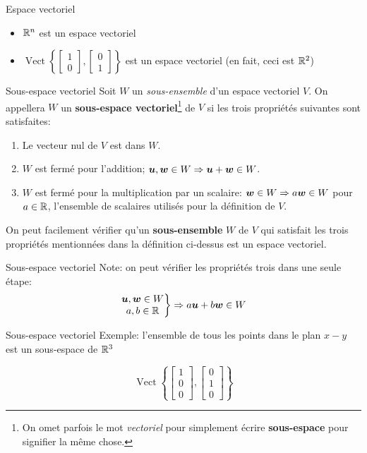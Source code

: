 \documentclass[french, handout]{beamer}
\begin{document}
\begin{frame}{Espace vectoriel}
\begin{itemize}
\item $\mathbb{R}^n$ est un espace vectoriel
\item $\displaystyle
\operatorname{Vect}\left\{
\begin{bmatrix}
1 \\ 0
\end{bmatrix}
,\begin{bmatrix}
0 \\ 1
\end{bmatrix}
\right\}
$
est un espace vectoriel (en fait, ceci est $\mathbb{R}^2$)
\end{itemize}
\end{frame}

\begin{frame}{Sous-espace vectoriel}
Soit $W$ un \textit{sous-ensemble} d'un espace vectoriel $V$.  
On appellera $W$ un \textbf{sous-espace vectoriel}\footnote{On omet parfois le mot \textit{vectoriel}
pour simplement écrire \textbf{sous-espace} pour signifier la même chose.} de $V$ si
les trois propriétés suivantes sont satisfaites:
\begin{enumerate}
\item Le vecteur nul de $V$ est dans $W$.
\item $W$ est fermé pour l'addition; $\boldsymbol{u}, \boldsymbol{w} \in W \Rightarrow \boldsymbol{u} + \boldsymbol{w} \in W$.
\item $W$ est fermé pour la multiplication par un scalaire: $\boldsymbol{w}\in W \Rightarrow a\boldsymbol{w}\in W$ pour $a\in \mathbb{R}$,
l'ensemble de scalaires utilisés pour la définition de $V$.
\end{enumerate}

On peut facilement vérifier qu'un \textbf{sous-ensemble} $W$ de $V$ qui satisfait les trois propriétés mentionnées dans la définition ci-dessus est un espace vectoriel.
\end{frame}

\begin{frame}{Sous-espace vectoriel}
Note: on peut vérifier les propriétés trois dans une seule étape:
\[
\left.
\begin{matrix}
\boldsymbol{u}, \boldsymbol{w} \in W \\
a, b \in \mathbb{R}
\end{matrix}
\right\}
\Rightarrow a\boldsymbol{u} + b\boldsymbol{w} \in W
\]
\end{frame}

\begin{frame}{Sous-espace vectoriel}
Exemple: l'ensemble de tous les points dans le plan $x-y$ est
un sous-espace de $\mathbb{R}^3$

\[
\operatorname{Vect}\left\{
\begin{bmatrix}
1\\0\\0
\end{bmatrix},
\begin{bmatrix}
0\\1\\0
\end{bmatrix}
\right\}
\]
\end{frame}
\end{document}
